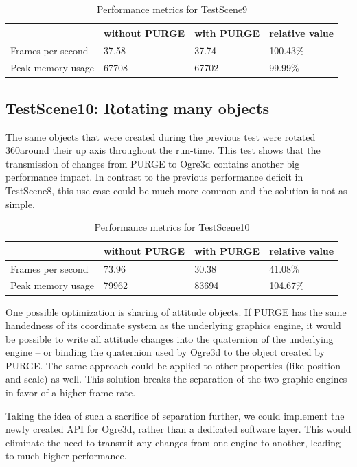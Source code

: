 		\begin{table}[htpb]
			\center
			\caption{Performance metrics for TestScene9}
			\begin{tabular}{l | l | l | l}
				& without PURGE & with PURGE & relative value\\ \hline
				Frames per second & 37.58 & 37.74 & 100.43\%\\
				Peak memory usage & 67708 & 67702 & 99.99\%\\
			\end{tabular}
			\label{tbl:Performance9}
		\end{table}

	\subsection{TestScene10: Rotating many objects}

		The same objects that were created during the previous test were rotated 360\degree around their up axis throughout the run-time. This test shows that the transmission of changes from PURGE to Ogre3d contains another big performance impact. In contrast to the previous performance deficit in TestScene8, this use case could be much more common and the solution is not as simple.
		
		\begin{table}[htpb]
			\center
			\caption{Performance metrics for TestScene10}
			\begin{tabular}{l | l | l | l}
				& without PURGE & with PURGE & relative value\\ \hline
				Frames per second & 73.96 & 30.38 & 41.08\%\\
				Peak memory usage & 79962 & 83694 & 104.67\%\\
			\end{tabular}
			\label{tbl:Performance10}
		\end{table}

		One possible optimization is sharing of attitude objects. If PURGE has the same handedness of its coordinate system as the underlying graphics engine, it would be possible to write all attitude changes into the quaternion of the underlying engine -- or binding the quaternion used by Ogre3d to the object created by PURGE. The same approach could be applied to other properties (like position and scale) as well. This solution breaks the separation of the two graphic engines in favor of a higher frame rate.

		Taking the idea of such a sacrifice of separation further, we could implement the newly created API for Ogre3d, rather than a dedicated software layer. This would eliminate the need to transmit any changes from one engine to another, leading to much higher performance.

